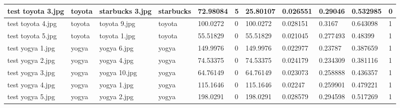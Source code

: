 \begin{landscape}
\begin{longtable}{|p{2cm}|p{1.5cm}|p{2cm}|p{1.5cm}|p{2cm}|p{1cm}|p{2cm}|p{2cm}|p{2cm}|p{2cm}|p{1cm}|}
		test toyota 3.jpg    & toyota           & starbucks 3.jpg       & starbucks                   & 72.98084              & 5                       & 25.80107                   & 0.026551              & 0.29046               & 0.532985                 & 0                \\ \hline
		test toyota 4.jpg    & toyota           & toyota 9.jpg          & toyota                      & 100.0272              & 0                       & 100.0272                   & 0.028151              & 0.3167                & 0.643098                 & 1                \\ \hline
		test toyota 5.jpg    & toyota           & toyota 1.jpg          & toyota                      & 55.51829              & 0                       & 55.51829                   & 0.021045              & 0.277493              & 0.48399                  & 1                \\ \hline
		test yogya 1.jpg     & yogya            & yogya 6.jpg           & yogya                       & 149.9976              & 0                       & 149.9976                   & 0.022977              & 0.23787               & 0.387659                 & 1                \\ \hline
		test yogya 2.jpg     & yogya            & yogya 4.jpg           & yogya                       & 74.53375              & 0                       & 74.53375                   & 0.024179              & 0.234309              & 0.381116                 & 1                \\ \hline
		test yogya 3.jpg     & yogya            & yogya 10.jpg          & yogya                       & 64.76149              & 0                       & 64.76149                   & 0.023073              & 0.258888              & 0.436357                 & 1                \\ \hline
		test yogya 4.jpg     & yogya            & yogya 1.jpg           & yogya                       & 115.1646              & 0                       & 115.1646                   & 0.02247               & 0.259901              & 0.479221                 & 1                \\ \hline
		test yogya 5.jpg     & yogya            & yogya 2.jpg           & yogya                       & 198.0291              & 0                       & 198.0291                   & 0.028579              & 0.294598              & 0.517269                 & 1                \\ \hline
	\end{longtable}
\end{landscape}

